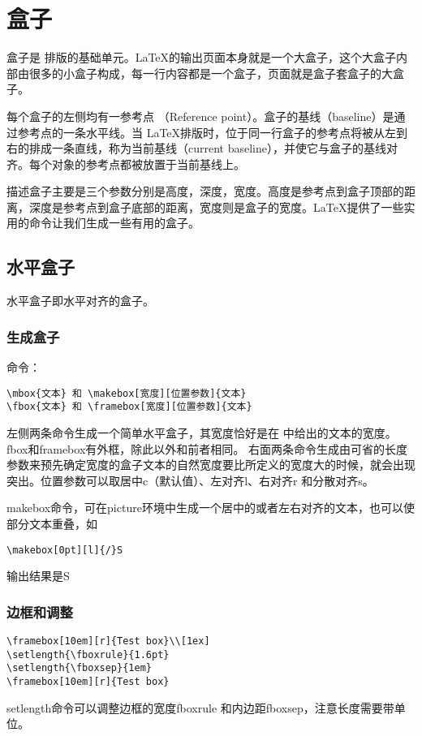 \documentclass[11pt]{article}%
\begin{document}
\section{盒子}
盒子是 排版的基础单元。\LaTeX 的输出页面本身就是一个大盒子，这个大盒子内部由很多的小盒子构成，每一行内容都是一个盒子，页面就是盒子套盒子的大盒子。

每个盒子的左侧均有一参考点 （Reference point）。盒子的基线（baseline）是通过参考点的一条水平线。当 \LaTeX 排版时，位于同一行盒子的参考点将被从左到右的排成一条直线，称为当前基线（current baseline），并使它与盒子的基线对齐。每个对象的参考点都被放置于当前基线上。

描述盒子主要是三个参数分别是高度，深度，宽度。高度是参考点到盒子顶部的距离，深度是参考点到盒子底部的距离，宽度则是盒子的宽度。\LaTeX 提供了一些实用的命令让我们生成一些有用的盒子。
\subsection{水平盒子}
水平盒子即水平对齐的盒子。
\subsubsection{生成盒子}
命令：
\begin{verbatim}
\mbox{文本} 和 \makebox[宽度][位置参数]{文本}
\fbox{文本} 和 \framebox[宽度][位置参数]{文本}
\end{verbatim}

左侧两条命令生成一个简单水平盒子，其宽度恰好是在{ }中给出的文本的宽度。fbox和framebox有外框，除此以外和前者相同。
右面两条命令生成由可省的长度参数来预先确定宽度的盒子文本的自然宽度要比所定义的宽度大的时候，就会出现突出。位置参数可以取居中c（默认值）、左对齐l、右对齐r 和分散对齐s。

 makebox命令，可在picture环境中生成一个居中的或者左右对齐的文本，也可以使部分文本重叠，如
\begin{verbatim}
\makebox[0pt][l]{/}S
\end{verbatim}
输出结果是\makebox[0pt][l]{/}S
\subsubsection{边框和调整}
\begin{verbatim}
\framebox[10em][r]{Test box}\\[1ex]
\setlength{\fboxrule}{1.6pt}
\setlength{\fboxsep}{1em}
\framebox[10em][r]{Test box}
\end{verbatim}
setlength命令可以调整边框的宽度fboxrule 和内边距fboxsep，注意长度需要带单位。
\end{document}
